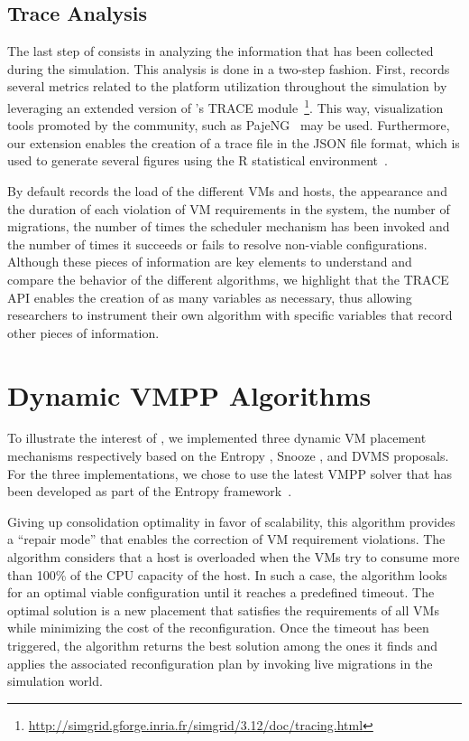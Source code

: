 \subsection{Trace Analysis}
\label{subsec:traces-analysis}

The last step of \vmps consists in analyzing the information that has
been collected during the simulation.
This analysis is done in a two-step fashion. First, \vmps records
several metrics related to the platform utilization throughout the
simulation by leveraging an extended version of \sg's TRACE
module~\footnote{\url{http://simgrid.gforge.inria.fr/simgrid/3.12/doc/tracing.html}}.
This way, visualization tools promoted by the \sg community, such as
PajeNG~\cite{pageng:www} may be used. Furthermore, our extension
enables the creation of a trace file in the JSON file format, which is
used to generate several figures using the R statistical environment~\cite{R:Bloomfield:2014}.

By default \vmps records the load of the different VMs and hosts, the
appearance and the duration of each violation of VM requirements in
the system, the number of migrations, the number of times the
scheduler mechanism has been invoked and the number of times it
succeeds or fails to resolve non-viable configurations.
%
Although these pieces of information are key elements to understand
and compare the behavior of the different algorithms, we highlight
that the TRACE API enables the creation of as many variables as
necessary, thus allowing researchers to instrument their own algorithm
with specific variables that record other pieces of information.

\section{Dynamic VMPP Algorithms}
\label{sec:vm-schedulers}
To illustrate the interest of \vmps, we implemented three dynamic VM
placement mechanisms respectively based on the Entropy
\cite{Hermenier:2009:ECM:1508293.1508300}, Snooze
\cite{feller:ccgrid12}, and DVMS \cite{quesnel:cpe2012} proposals. For the three
implementations, we chose to use the latest VMPP solver that has been
developed as part of the Entropy
framework~\cite{hermenier:cp11}.

%
Giving up consolidation
optimality in favor of scalability, this algorithm provides a ``repair
mode'' that enables the correction of VM requirement violations. The algorithm considers that a host is
overloaded when the VMs try to consume more than 100\% of the CPU
capacity of the host. In such a case, the algorithm looks for
an optimal viable configuration until it reaches a predefined timeout.
The optimal solution is a new placement that satisfies
the requirements of all VMs while minimizing the cost of the
reconfiguration.
Once the timeout has been triggered, the algorithm returns
the best solution among the ones it finds and applies the associated
reconfiguration plan by invoking live migrations in the simulation
world.

